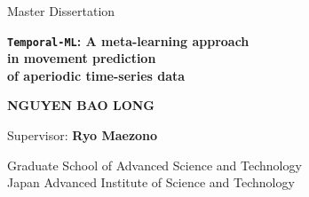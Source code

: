 \begin{titlepage}

\begin{center}

{
    \vfill
    \large Master Dissertation\\[3cm]
}

{
    \LARGE \bfseries \verb|Temporal-ML|: A meta-learning approach\\in movement prediction\\of aperiodic time-series data\\[3cm]
}

{
    \large \bfseries NGUYEN BAO LONG\\[2cm]
}

\vfill

{
    Supervisor: \textbf{Ryo Maezono}\\[2cm]
}

Graduate School of Advanced Science and Technology\\
Japan Advanced Institute of Science and Technology




\end{center}


    
    
    

\end{titlepage}
